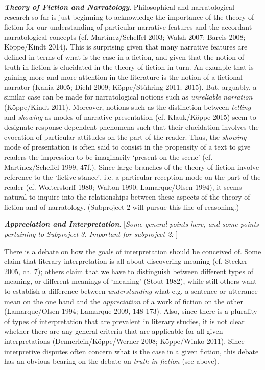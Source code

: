 \vspace{.2cm}
\noindent\textbf{\emph{Theory of Fiction and Narratology}}. Philosophical and
narratological research so far is just beginning to acknowledge the
importance of the theory of fiction for our understanding of particular
narrative features and the accordant narratological concepts (cf.
Mart\'inez/Scheffel 2003; Walsh 2007; Bareis 2008; K\"oppe/Kindt 2014). This
is surprising given that many narrative features are defined in terms of
what is the case in a fiction, and given that the notion of truth in
fiction is elucidated in the theory of fiction in turn. An example that
is gaining more and more attention in the literature is the notion of a
fictional narrator (Kania 2005; Diehl 2009; K\"oppe/St\"uhring 2011; 2015).
But, arguably, a similar case can be made for narratological notions
such as \emph{unreliable narration} (K\"oppe/Kindt 2011). Moreover,
notions such as the distinction between \emph{telling} and
\emph{showing} as modes of narrative presentation (cf. Klauk/K\"oppe 2015)
seem to designate response-dependent phenomena such that their
elucidation involves the evocation of particular attitudes on the part
of the reader. Thus, the \emph{showing} mode of presentation is often
said to consist in the propensity of a text to give readers the
impression to be imaginarily `present on the scene' (cf.
Mart\'inez/Scheffel 1999, 47f.). Since large branches of the theory of
fiction involve reference to the `fictive stance', i.e. a particular
reception mode on the part of the reader (cf. Wolterstorff 1980; Walton
1990; Lamarque/Olsen 1994), it seems natural to inquire into the
relationships between these aspects of the theory of fiction and of
narratology. (Subproject 2 will pursue this line of reasoning.)

\vspace{.2cm}
\noindent\textbf{\emph{Appreciation and Interpretation}}. {[}\emph{Some general
points here, and some points pertaining to} {\emph{Subproject 3}}\emph{.
Important for subproject 2:} {]}

There is a debate on how the goals of interpretation should be conceived
of. Some claim that literary interpretation is all about discovering
meaning (cf. Stecker 2005, ch. 7); others claim that we have to
distinguish between different types of meaning, or different meanings of
`meaning' (Stout 1982), while still others want to establish a
difference between \emph{understanding} what e.g. a sentence or
utterance mean on the one hand and the \emph{appreciation} of a work of
fiction on the other (Lamarque/Olsen 1994; Lamarque 2009, 148-173).
Also, since there is a plurality of types of interpretation that are
prevalent in literary studies, it is not clear whether there are any
general criteria that are applicable for all given interpretations
(Dennerlein/K\"oppe/Werner 2008; K\"oppe/Winko 2011). Since interpretive
disputes often concern what is the case in a given fiction, this debate
has an obvious bearing on the debate on \emph{truth in fiction} (see
above).
